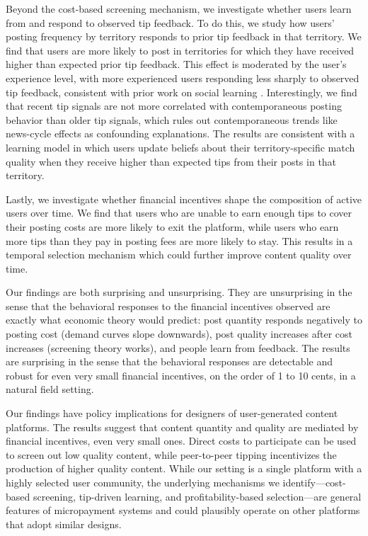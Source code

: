 Beyond the cost-based screening mechanism, we investigate whether users learn from and respond to observed tip feedback. To do this, we study how users' posting frequency by territory responds to prior tip feedback in that territory. We find that users are more likely to post in territories for which they have received higher than expected prior tip feedback. This effect is moderated by the user's experience level, with more experienced users responding less sharply to observed tip feedback, consistent with prior work on social learning \citep{conley2010}. Interestingly, we find that recent tip signals are not more correlated with contemporaneous posting behavior than older tip signals, which rules out contemporaneous trends like news-cycle effects as confounding explanations. The results are consistent with a learning model in which users update beliefs about their territory-specific match quality when they receive higher than expected tips from their posts in that territory.

Lastly, we investigate whether financial incentives shape the composition of active users over time. We find that users who are unable to earn enough tips to cover their posting costs are more likely to exit the platform, while users who earn more tips than they pay in posting fees are more likely to stay. This results in a temporal selection mechanism which could further improve content quality over time.

Our findings are both surprising and unsurprising. They are unsurprising in the sense that the behavioral responses to the financial incentives observed are exactly what economic theory would predict: post quantity responds negatively to posting cost (demand curves slope downwards), post quality increases after cost increases (screening theory works), and people learn from feedback. The results are surprising in the sense that the behavioral responses are detectable and robust for even very small financial incentives, on the order of 1 to 10 cents, in a natural field setting. 

Our findings have policy implications for designers of user-generated content platforms. The results suggest that content quantity and quality are mediated by financial incentives, even very small ones. Direct  costs to participate can be used to screen out low quality content, while peer-to-peer tipping incentivizes the production of higher quality content. While our setting is a single platform with a highly selected user community, the underlying mechanisms we identify---cost-based screening, tip-driven learning, and profitability-based selection---are general features of micropayment systems and could plausibly operate on other platforms that adopt similar designs.

